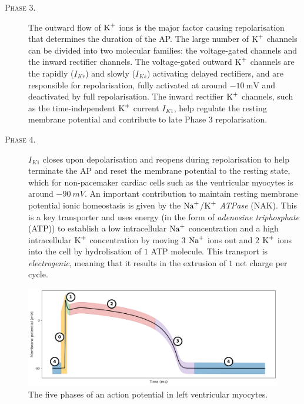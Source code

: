 \begin{description}
	\item[\textsc{Phase $3$.}] The outward flow of $\textrm{K}^{+}$ ions is the major factor causing repolarisation that determines the duration of the AP. The large number of $\textrm{K}^{+}$ channels can be divided into two molecular families: the voltage-gated channels and the inward rectifier channels. The voltage-gated outward $\textrm{K}^{+}$ channels are the rapidly ($I_{Kr}$) and slowly ($I_{Ks}$) activating delayed rectifiers, and are responsible for repolarisation, fully activated at around $\SI{-10}{\milli\volt}$ and deactivated by full repolarisation. The inward rectifier $\textrm{K}^{+}$ channels, such as the time-independent $\textrm{K}^{+}$ current $I_{K1}$, help regulate the resting membrane potential and contribute to late Phase $3$ repolarisation.
	\item[\textsc{Phase $4$.}] $I_{K1}$ closes upon depolarisation and reopens during repolarisation to help terminate the AP and reset the membrane potential to the resting state, which for non-pacemaker cardiac cells such as the ventricular myocytes is around $\SI{-90}{mV}$. An important contribution to maintain resting membrane potential ionic homeostasis is given by the $\textrm{Na}^{+}$/$\textrm{K}^{+}$ \textit{ATPase} (\acs{NAK}). This is a key transporter and uses energy (in the form of \textit{adenosine triphosphate} (\acs{ATP})) to establish a low intracellular $\textrm{Na}^{+}$ concentration and a high intracellular $\textrm{K}^{+}$ concentration by moving $3$ $\textrm{Na}^{+}$ ions out and $2$ $\textrm{K}^{+}$ ions into the cell by hydrolisation of $1$ ATP molecule. This transport is \textit{electrogenic}, meaning that it results in the extrusion of $1$ net charge per cycle.
\end{description}

\begin{figure}[ht!]
    \myfloatalign
    \includegraphics[width=\textwidth]{figures/chapter01/AP_phases.pdf}
    \caption{The five phases of an action potential in left ventricular myocytes.}
    \label{fig:my_label}
\end{figure}


